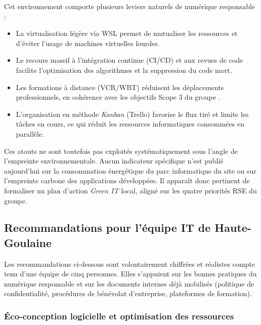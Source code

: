 Cet environnement comporte plusieurs leviers naturels de numérique responsable :

\begin{itemize}
    \item La virtualisation légère via WSL permet de mutualiser les ressources et d'éviter l'usage de machines virtuelles lourdes.
    \item Le recours massif à l'intégration continue (CI/CD) et aux revues de code facilite l'optimisation des algorithmes et la suppression du code mort.
    \item Les formations à distance (VCR/WBT) réduisent les déplacements professionnels, en cohérence avec les objectifs Scope 3 du groupe \cite{iveco_annual_2025}.
    \item L'organisation en méthode \textit{Kanban} (Trello) favorise le flux tiré et limite les tâches en cours, ce qui réduit les ressources informatiques consommées en parallèle.
\end{itemize}

Ces atouts ne sont toutefois pas exploités systématiquement sous l'angle de l'empreinte environnementale. Aucun indicateur spécifique n'est publié aujourd'hui sur la consommation énergétique du parc informatique du site ou sur l'empreinte carbone des applications développées. Il apparaît donc pertinent de formaliser un plan d'action \textit{Green IT} local, aligné sur les quatre priorités RSE du groupe.

\subsection{Recommandations pour l'équipe IT de Haute-Goulaine}

Les recommandations ci-dessous sont volontairement chiffrées et réalistes compte tenu d'une équipe de cinq personnes. Elles s'appuient sur les bonnes pratiques du numérique responsable et sur les documents internes déjà mobilisés (politique de confidentialité, procédures de bénévolat d'entreprise, plateformes de formation).

\subsubsection*{Éco-conception logicielle et optimisation des ressources}


